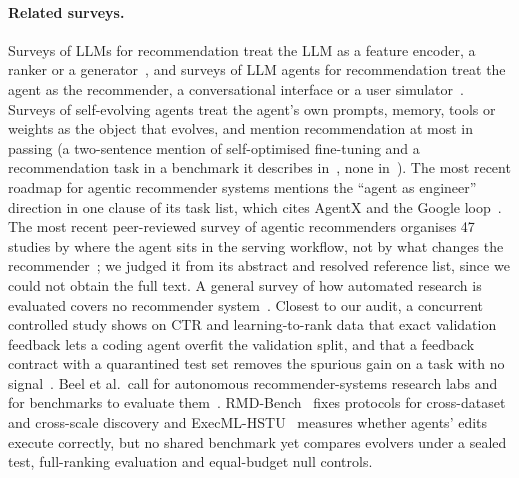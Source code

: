 \documentclass[sigconf,nonacm]{acmart}
\begin{document}
\paragraph{Related surveys.} Surveys of LLMs for recommendation treat the LLM as a feature encoder,
a ranker or a generator~\cite{wu2023llmrecsurvey,lin2023recsysllmsurvey}, and surveys of LLM agents for recommendation
treat the agent as the recommender, a conversational interface or a user simulator~\cite{peng2025agentsurvey,zhang2025agentsearchsurvey,
huang2025fmsurvey}. Surveys of self-evolving agents treat the agent's own prompts, memory, tools or weights as the
object that evolves, and mention recommendation at most in passing (a two-sentence mention of self-optimised fine-tuning and a recommendation task in a benchmark it describes
in~\cite{gao2025selfevolvingsurvey}, none in~\cite{fang2025selfevolvingsurvey}).
The most recent roadmap for agentic recommender systems mentions the ``agent as engineer'' direction in one clause of its task list, which cites AgentX and the Google loop~\cite{lin2026roadmap}. The most recent peer-reviewed
survey of agentic recommenders organises 47 studies by where the agent sits in the serving workflow, not by what
changes the recommender~\cite{xu2026scoringworkflow}; we judged it from its abstract and resolved reference list, since we could not obtain the full text. A general survey of how automated research is evaluated covers
no recommender system~\cite{zhang2026autoreseval}. Closest to our audit, a concurrent controlled study shows on CTR and
learning-to-rank data that exact validation feedback lets a coding agent overfit the validation split, and that a
feedback contract with a quarantined test set removes the spurious gain on a task with no signal~\cite{yao2026feedbackcontract}. Beel et al.\ call for autonomous recommender-systems research labs and for benchmarks
to evaluate them~\cite{beel2025autoreclab}. RMD-Bench~\cite{peng2026population} fixes protocols for cross-dataset and
cross-scale discovery and ExecML-HSTU~\cite{chen2026rankevolve} measures whether agents' edits execute correctly, but no
shared benchmark yet compares evolvers under a sealed test, full-ranking evaluation and
equal-budget null controls.
\end{document}
